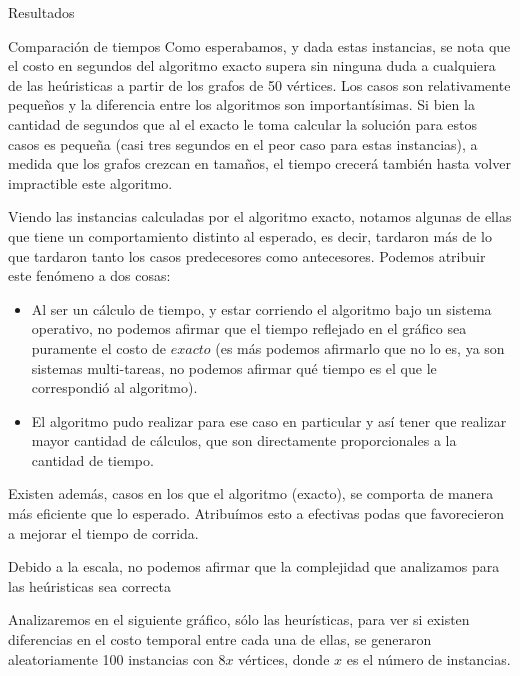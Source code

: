 \documentclass[12pt,titlepage]{article}
\begin{document}
\begin{section}{Resultados}
\begin{subsection}{Comparación de tiempos}
		Como esperabamos, y dada estas instancias, se nota que el costo en segundos del algoritmo exacto supera sin ninguna duda a cualquiera de las heúristicas a partir de los grafos de 50 vértices. Los casos son relativamente pequeños y la diferencia entre los algoritmos son importantísimas. Si bien la cantidad de segundos que al el exacto le toma calcular la solución para estos casos es pequeña (casi tres segundos en el peor caso para estas instancias), a medida que los grafos crezcan en tamaños, el tiempo crecerá también hasta volver impractible este algoritmo.

		Viendo las instancias calculadas por el algoritmo exacto, notamos algunas de ellas que tiene un comportamiento distinto al esperado, es decir, tardaron más de lo que tardaron tanto los casos predecesores como antecesores. Podemos atribuir este fenómeno a dos cosas:

			\begin{itemize}
				\item Al ser un cálculo de tiempo, y estar corriendo el algoritmo bajo un sistema operativo, no podemos afirmar que el tiempo reflejado en el gráfico sea puramente el costo de $exacto$ (es más podemos afirmarlo que no lo es, ya son sistemas multi-tareas, no podemos afirmar qué tiempo es el que le correspondió al algoritmo).
				\item El algoritmo pudo realizar para ese caso en particular y así tener que realizar mayor cantidad de cálculos, que son directamente proporcionales a la cantidad de tiempo.
			\end{itemize}

		Existen además, casos en los que el algoritmo (exacto), se comporta de manera más eficiente que lo esperado. Atribuímos esto a efectivas podas que favorecieron a mejorar el tiempo de corrida.

		Debido a la escala, no podemos afirmar que la complejidad que analizamos para las heúristicas sea correcta

		Analizaremos en el siguiente gráfico, sólo las heurísticas, para ver si existen diferencias en el costo temporal entre cada una de ellas, se generaron aleatoriamente 100 instancias con $8x$ vértices, donde $x$ es el número de instancias.	
		

\end{subsection}
\end{section}
\end{document}
